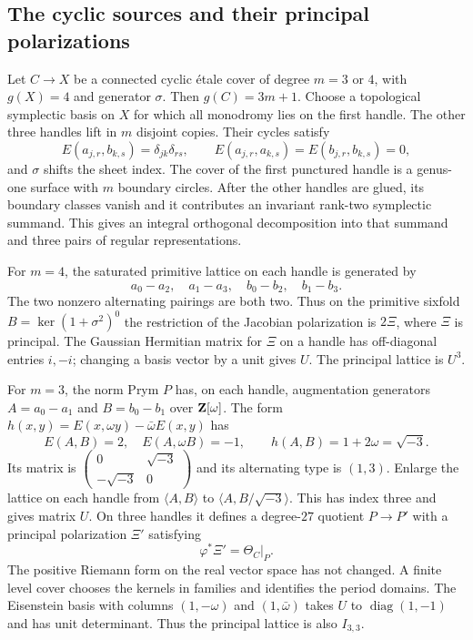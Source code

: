 \subsection{The cyclic sources and their principal polarizations}

Let $C\to X$ be a connected cyclic \'etale cover of degree $m=3$ or $4$, with $g(X)=4$ and generator $\sigma$. Then $g(C)=3m+1$. Choose a topological symplectic basis on $X$ for which all monodromy lies on the first handle. The other three handles lift in $m$ disjoint copies. Their cycles satisfy
\[
 E(a_{j,r},b_{k,s})=\delta_{jk}\delta_{rs},
 \qquad E(a_{j,r},a_{k,s})=E(b_{j,r},b_{k,s})=0,
\]
and $\sigma$ shifts the sheet index. The cover of the first punctured handle is a genus-one surface with $m$ boundary circles. After the other handles are glued, its boundary classes vanish and it contributes an invariant rank-two symplectic summand. This gives an integral orthogonal decomposition into that summand and three pairs of regular representations.

For $m=4$, the saturated primitive lattice on each handle is generated by
\[
 a_0-a_2,\quad a_1-a_3,\quad b_0-b_2,\quad b_1-b_3.
\]
The two nonzero alternating pairings are both two. Thus on the primitive sixfold $B=\ker(1+\sigma^2)^0$ the restriction of the Jacobian polarization is $2\Xi$, where $\Xi$ is principal. The Gaussian Hermitian matrix for $\Xi$ on a handle has off-diagonal entries $i,-i$; changing a basis vector by a unit gives $U$. The principal lattice is $U^3$.

For $m=3$, the norm Prym $P$ has, on each handle, augmentation generators $A=a_0-a_1$ and $B=b_0-b_1$ over $\mathbf Z[\omega]$. The form
$h(x,y)=E(x,\omega y)-\bar\omega E(x,y)$ has
\[
 E(A,B)=2,\quad E(A,\omega B)=-1,
 \qquad h(A,B)=1+2\omega=\sqrt{-3}.
\]
Its matrix is $\left(\begin{smallmatrix}0&\sqrt{-3}\\-\sqrt{-3}&0\end{smallmatrix}\right)$ and its alternating type is $(1,3)$. Enlarge the lattice on each handle from $\langle A,B\rangle$ to $\langle A,B/\sqrt{-3}\rangle$. This has index three and gives matrix $U$. On three handles it defines a degree-$27$ quotient $P\to P'$ with a principal polarization $\Xi'$ satisfying
\[
 \varphi^*\Xi'=\Theta_C|_P.
\]
The positive Riemann form on the real vector space has not changed. A finite level cover chooses the kernels in families and identifies the period domains. The Eisenstein basis with columns $(1,-\omega)$ and $(1,\bar\omega)$ takes $U$ to $\operatorname{diag}(1,-1)$ and has unit determinant. Thus the principal lattice is also $I_{3,3}$.

